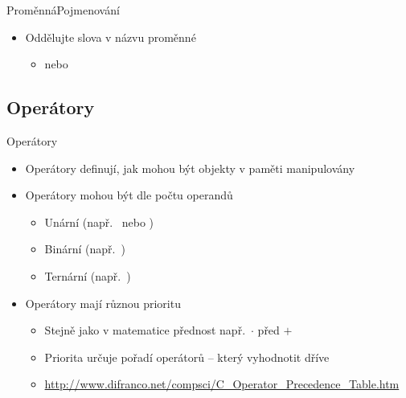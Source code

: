\begin{frame}{Proměnná}{Pojmenování}
\begin{itemize}
\begin{itemize}
      \pause

      \item Oddělujte slova v názvu proměnné
      \begin{itemize}
	\item {} nebo 
      \end{itemize}

    \end{itemize}

  \end{itemize}

\end{frame}

\subsection*{Operátory}
\frame{\subsectionpage}

\begin{frame}{Operátory}

  \begin{itemize}
    \item Operátory definují, jak mohou být objekty v paměti manipulovány

    \pause

    \item Operátory mohou být dle počtu operandů
    \begin{itemize}
      \item Unární (např.\  nebo )
      \item Binární (např.\ )
      \item Ternární (např.\ )
    \end{itemize}

    \pause

    \item Operátory mají různou prioritu
    \begin{itemize}
      \item Stejně jako v matematice přednost např.\ $\cdot$ před $+$
      \item Priorita určuje pořadí operátorů -- který vyhodnotit dříve

      \pause

      \item \footnotesize \url{http://www.difranco.net/compsci/C_Operator_Precedence_Table.htm}
    \end{itemize}
  \end{itemize}

\end{frame}

